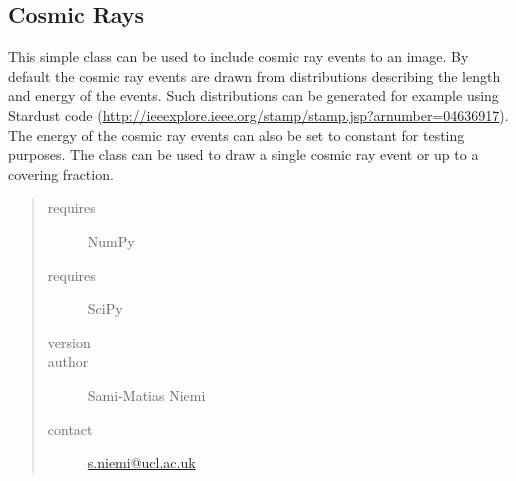 \documentclass[a4paper,11pt,english]{sphinxmanual}
\begin{document}
\label{support:module-support.cosmicrays}

\subsection{Cosmic Rays}
\label{support:cosmic-rays}
This simple class can be used to include cosmic ray events to an image.
By default the cosmic ray events are drawn from distributions describing
the length and energy of the events. Such distributions can be generated
for example using Stardust code (\href{http://ieeexplore.ieee.org/stamp/stamp.jsp?arnumber=04636917}{http://ieeexplore.ieee.org/stamp/stamp.jsp?arnumber=04636917}).
The energy of the cosmic ray events can also be set to constant for
testing purposes. The class can be used to draw a single cosmic ray
event or up to a covering fraction.
\begin{quote}\begin{description}
\item[{requires}] \leavevmode
NumPy

\item[{requires}] \leavevmode
SciPy

\item[{version}] 

\item[{author}] \leavevmode
Sami-Matias Niemi

\item[{contact}] \leavevmode
\href{mailto:s.niemi@ucl.ac.uk}{s.niemi@ucl.ac.uk}

\end{description}\end{quote}
\end{document}
